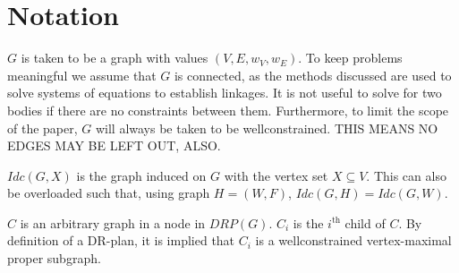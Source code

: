 \documentclass[11pt]{article}
\begin{document}
\section{Notation}
$G$ is taken to be a graph with values $(V,E,w_V,w_E)$. To keep problems meaningful we assume that $G$ is connected, as the methods discussed are used to solve systems of equations to establish linkages. It is not useful to solve for two bodies if there are no constraints between them. Furthermore, to limit the scope of the paper, $G$ will always be taken to be wellconstrained. THIS MEANS NO EDGES MAY BE LEFT OUT, ALSO.

$Idc(G,X)$ is the graph induced on $G$ with the vertex set $X\subseteq V$. This can also be overloaded such that, using graph $H=(W,F)$, $Idc(G,H)=Idc(G,W)$.

$C$ is an arbitrary graph in a node in $DRP(G)$. $C_i$ is the $i^{\text{th}}$ child of $C$. By definition of a DR-plan, it is implied that $C_i$ is a wellconstrained vertex-maximal proper subgraph.
\end{document}
